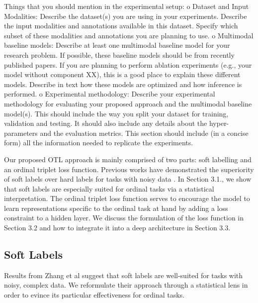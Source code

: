 Things that you should mention in the experimental setup:
o Dataset and Input Modalities: Describe the dataset(s) you are using in your
experiments. Describe the input modalities and annotations available in this dataset.
Specify which subset of these modalities and annotations you are planning to use.
o Multimodal baseline models: Describe at least one multimodal baseline model for your
research problem. If possible, these baseline models should be from recently published
papers. If you are planning to perform ablation experiments (e.g., your model without
component XX), this is a good place to explain these different models. Describe in text
how these models are optimized and how inference is performed.
o Experimental methodology: Describe your experimental methodology for evaluating
your proposed approach and the multimodal baseline model(s). This should include the
way you split your dataset for training, validation and testing. It should also include any
details about the hyper-parameters and the evaluation metrics. This section should
include (in a concise form) all the information needed to replicate the experiments.

\fi


Our proposed OTL approach is mainly comprised of two parts: soft labelling and an ordinal triplet loss function.
Previous works have demonstrated the superiority of soft labels over hard labels for tasks with noisy data \cite{zhang2019fsim}. %
In Section 3.1., we show that soft labels are especially suited for ordinal tasks via a statistical interpretation.
The ordinal triplet loss function serves to encourage the model to learn representations specific to the ordinal task at hand by adding a loss constraint to a hidden layer.
We discuss the formulation of the loss function in Section 3.2 and how to integrate it into a deep architecture in Section 3.3.


\subsection{Soft Labels}

Results from Zhang et al \cite{zhang2019fsim}
suggest that soft labels are well-suited for tasks with noisy, complex data.
We reformulate their approach through a statistical lens in order to evince its particular effectiveness for ordinal tasks.

